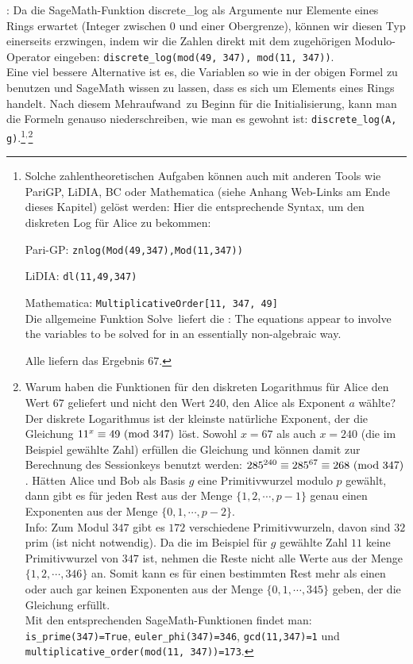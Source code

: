 \begin{refsegment}
\begin{remark}{:}
 Da die SageMath-Funktion discrete\_log als Argumente nur
Elemente eines Rings erwartet (Integer zwischen 0 und einer Obergrenze),
können wir diesen Typ einerseits erzwingen, indem wir die Zahlen direkt mit dem
zugehörigen Modulo-Operator eingeben: \texttt{discrete\_log(mod(49, 347), mod(11, 347))}.\\
Eine viel bessere Alternative ist es, die Variablen so wie in der obigen Formel
zu benutzen und SageMath wissen zu lassen, dass es sich um Elements eines Rings handelt.
Nach diesem \glqq Mehraufwand\grqq~zu Beginn für die Initialisierung, kann man die Formeln
genauso niederschreiben, wie man es gewohnt ist: \texttt{discrete\_log(A, g)}.\footnote{%
Solche zahlentheoretischen Aufgaben können auch mit anderen Tools wie PariGP,
LiDIA, BC oder Mathematica
(siehe Anhang Web-Links am Ende dieses Kapitel) gelöst werden:
Hier die entsprechende Syntax, um den diskreten Log für Alice zu bekommen:
	\begin{compactitem}
	\item Pari-GP: \texttt{znlog(Mod(49,347),Mod(11,347))}
	\item LiDIA:   \texttt{dl(11,49,347)}
	\item Mathematica: {\tt MultiplicativeOrder[11, 347, 49]}\\
		Die allgemeine Funktion \glqq Solve\grqq~liefert die  \grqq:
		The equations appear to involve the variables to be solved
		for in an essentially non-algebraic way.
	\end{compactitem}
Alle liefern das Ergebnis $67$.
}${}^,$\footnote{%
Warum haben die Funktionen für den diskreten
Logarithmus für Alice
den Wert $67$ geliefert und nicht den Wert 240, den Alice als Exponent $a$ wählte?\\
Der diskrete Logarithmus ist der kleinste natürliche Exponent, der die
Gleichung $11^x \equiv 49{\rm ~(mod~}347)$ löst. Sowohl $x=67$ als auch $x=240$ (die im Beispiel
gewählte Zahl) erfüllen die Gleichung und können damit zur Berechnung des
Sessionkeys benutzt werden: $285^{240}  \equiv 285^{67} \equiv 268 {\rm ~(mod~}347)$.
Hätten Alice und Bob als Basis $g$ eine Primitivwurzel modulo $p$ gewählt,
dann gibt es für jeden Rest aus der Menge
$\{1, 2, \cdots, p-1\}$ genau einen Exponenten aus der Menge $\{0, 1, \cdots, p-2\}.$\\
\indent Info: Zum Modul $347$ gibt es $172$ verschiedene Primitivwurzeln, davon sind $32$
prim (ist nicht notwendig).
Da die im Beispiel für $g$ gewählte Zahl $11$ keine Primitivwurzel
von $347$ ist, nehmen die Reste nicht alle Werte aus der Menge $\{1, 2, \cdots, 346\}$ an.
Somit kann es für einen bestimmten Rest mehr als einen oder auch gar keinen
Exponenten aus der Menge $\{0, 1, \cdots, 345\}$ geben, der die Gleichung
erfüllt.\\
Mit den entsprechenden SageMath-Funktionen findet man:\\
\texttt{is\_prime(347)=True}, \texttt{euler\_phi(347)=346}, \texttt{gcd(11,347)=1} und
\texttt{multiplicative\_order(mod(11, 347))=173}.

}
\end{remark}
\end{refsegment}
